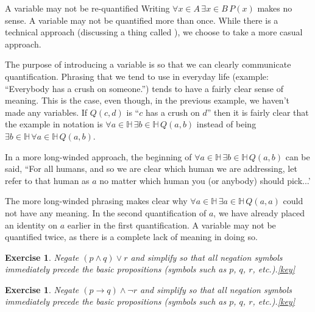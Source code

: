 \documentclass{book}
\newcounter{ekcounter}%
\theoremstyle{ekimcustom}
\newtheorem{exercise}[ekcounter]{Exercise}
\newcommand\defn[1]{{\color{blue}{\bf #1}}}
\begin{document}
\begin{bwarning}{A variable may not be re-quantified}{}
Writing $\forall x \in A\,\exists x \in B\,P(x)$ makes no sense. A variable may not be quantified more than once. While there is a technical approach (discussing a thing called \defn{binding}), we choose to take a more casual approach.

\vskip6pt

The purpose of introducing a variable is so that we can clearly communicate quantification. Phrasing that we tend to use in everyday life (example: ``Everybody has a crush on someone.'') tends to have a fairly clear sense of meaning. This is the case, even though, in the previous example, we haven't made any variables. If $Q(c,d)$ is ``$c$ has a crush on $d$'' then it is fairly clear that the example in notation is $\forall a \in \mathbb{H}\,\exists b \in \mathbb{H}\,Q(a,b)$ instead of being $\exists b \in \mathbb{H}\,\forall a \in \mathbb{H}\,Q(a,b)$.

\vskip6pt

In a more long-winded approach, the beginning of $\forall a \in \mathbb{H}\,\exists b \in \mathbb{H}\,Q(a,b)$ can be said, ``For all humans, and so we are clear which human we are addressing, let refer to that human as $a$ no matter which human you (or anybody) should pick...'

\vskip 6pt

The more long-winded phrasing makes clear why $\forall a \in \mathbb{H}\,\exists a \in \mathbb{H}\,Q(a,a)$ could not have any meaning. In the second quantification of $a$, we have already placed an identity on $a$ earlier in the first quantification. A variable may not be quantified twice, as there is a complete lack of meaning in doing so. 
\end{bwarning}

\begin{exercise}
Negate $(p \wedge q) \vee r$ and simplify so that all negation symbols immediately precede the basic propositions (symbols such as $p$, $q$, $r$, etc.).\quad\quad\href{https://www.sharelatex.com/project/59bece9ac3ef170ecbecf858}{{\color{red}[key]}}
\end{exercise}

\begin{exercise}
Negate $(p \rightarrow q) \wedge \neg r$ and simplify so that all negation symbols immediately precede the basic propositions (symbols such as $p$, $q$, $r$, etc.).\quad\quad\href{https://www.sharelatex.com/project/59becef3c3ef170ecbecf85d}{{\color{red}[key]}}
\end{exercise}
\end{document}
